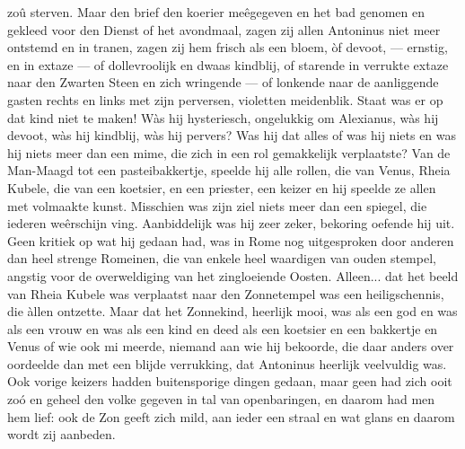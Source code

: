 \documentclass[a4paper, 12pt, oneside, dutch]{article}
\begin{document}
zoû sterven. Maar den brief den koerier meêgegeven en het bad genomen en gekleed voor den Dienst of het avondmaal, zagen zij allen Antoninus niet meer ontstemd en in tranen, zagen zij hem frisch als een bloem, òf devoot, --- ernstig, en in extaze --- of dollevroolijk en dwaas kindblij, of starende in verrukte extaze naar den Zwarten Steen en zich wringende --- of lonkende naar de aanliggende gasten rechts en links met zijn perversen, violetten meidenblik. Staat was er op dat kind niet te maken! Wàs hij hysteriesch, ongelukkig om Alexianus, wàs hij devoot, wàs hij kindblij, wàs hij pervers? Was hij dat alles of was hij niets en was hij niets meer dan een mime, die zich in een rol gemakkelijk verplaatste? Van de Man-Maagd tot een pasteibakkertje, speelde hij alle rollen, die van Venus, Rheia Kubele, die van een koetsier, en een priester, een keizer en hij speelde ze allen met volmaakte kunst. Misschien was zijn ziel niets meer dan een spiegel, die iederen weêrschijn ving. Aanbiddelijk was hij zeer zeker, bekoring oefende hij uit. Geen kritiek op wat hij gedaan had, was in Rome nog uitgesproken door anderen dan heel strenge Romeinen, die van enkele heel waardigen van ouden stempel, angstig voor de overweldiging van het zingloeiende Oosten. Alleen... dat het beeld van Rheia Kubele was verplaatst naar den Zonnetempel was een heiligschennis, die àllen ontzette. Maar dat het Zonnekind, heerlijk mooi, was als een god en was als een vrouw en was als een kind en deed als een koetsier en een bakkertje en Venus of wie ook mi meerde, niemand aan wie hij bekoorde, die daar anders over oordeelde dan met een blijde verrukking, dat Antoninus heerlijk veelvuldig was. Ook vorige keizers hadden buitensporige dingen gedaan, maar geen had zich ooit zoó en geheel den volke gegeven in tal van openbaringen, en daarom had men hem lief: ook de Zon geeft zich mild, aan ieder een straal en wat glans en daarom wordt zij aanbeden.
\end{document}
